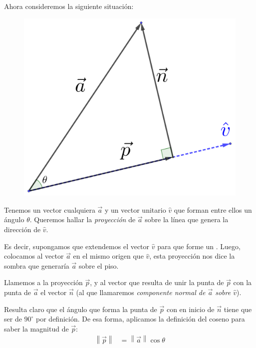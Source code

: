 \documentclass[12pt, fleqn]{report}                             %
\newcommand \Quote {\qq}                                        %
\newcommand{\Abs}[1]{\left\lVert #1 \right\lVert}               %
\begin{document}
                Ahora consideremos la siguiente situación:
                
                \begin{figure}[H]
                	\centering
                	\includegraphics[scale=1.1]{vectorProyection.png}
                \end{figure}
            
            	Tenemos un vector cualquiera $\vec{a}$ y un vector unitario $\hat{v}$ que forman entre ellos un ángulo $\theta$. Queremos hallar la \emph{proyección} de $\vec{a}$ sobre la línea que genera la dirección de $\hat{v}$.
            	
            	Es decir, supongamos que extendemos el vector $\hat{v}$ para que forme un \Quote{piso}. Luego, colocamos al vector $\vec{a}$ en el mismo origen que $\hat{v}$, esta proyección nos dice la sombra que generaría $\vec{a}$ sobre el piso.
            	
            	Llamemos a la proyección $\vec{p}$, y al vector que resulta de unir la punta de $\vec{p}$ con la punta de $\vec{a}$ el vector $\vec{n}$ (al que llamaremos \emph{componente normal de $\vec{a}$ sobre $\hat{v}$}).
            	
            	Resulta claro que el ángulo que forma la punta de $\vec{p}$ con en inicio de $\vec{n}$ tiene que ser de $90^\circ$ por definición. De esa forma, aplicamos la definición del coseno para saber la magnitud de $\vec{p}$:
            	\begin{align}
	            	{\Abs{\vec{p}}} &= \Abs{\vec{a}} \cos \theta
            	\end{align}
            
\end{document}
